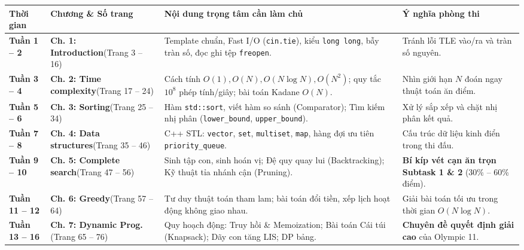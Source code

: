 \documentclass[11pt,a4paper]{article}
\begin{document}
\vspace{-0.2cm}
\begin{center}
\footnotesize
\begin{tabular}{@{}p{1.8cm}p{3.2cm}p{7.8cm}p{3.8cm}@{}}
\toprule
\textbf{Thời gian} & \textbf{Chương \& Số trang} & \textbf{Nội dung trọng tâm cần làm chủ} & \textbf{Ý nghĩa phòng thi} \\ \midrule
\textbf{Tuần 1 -- 2} & \textbf{Ch. 1: Introduction}\newline (Trang 3 -- 16) & Template chuẩn, Fast I/O (\texttt{cin.tie}), kiểu \texttt{long long}, bẫy tràn số, đọc ghi tệp \texttt{freopen}. & Tránh lỗi TLE vào/ra và tràn số nguyên. \\
\addlinespace[2pt]
\textbf{Tuần 3 -- 4} & \textbf{Ch. 2: Time complexity}\newline (Trang 17 -- 24) & Cách tính $O(1), O(N), O(N \log N), O(N^2)$; quy tắc $10^8$ phép tính/giây; bài toán Kadane $O(N)$. & Nhìn giới hạn $N$ đoán ngay thuật toán ăn điểm. \\
\addlinespace[2pt]
\textbf{Tuần 5 -- 6} & \textbf{Ch. 3: Sorting}\newline (Trang 25 -- 34) & Hàm \texttt{std::sort}, viết hàm so sánh (Comparator); Tìm kiếm nhị phân (\texttt{lower\_bound}, \texttt{upper\_bound}). & Xử lý sắp xếp và chặt nhị phân kết quả. \\
\addlinespace[2pt]
\textbf{Tuần 7 -- 8} & \textbf{Ch. 4: Data structures}\newline (Trang 35 -- 46) & C++ STL: \texttt{vector}, \texttt{set}, \texttt{multiset}, \texttt{map}, hàng đợi ưu tiên \texttt{priority\_queue}. & Cấu trúc dữ liệu kinh điển trong thi đấu. \\
\addlinespace[2pt]
\textbf{Tuần 9 -- 10} & \textbf{Ch. 5: Complete search}\newline (Trang 47 -- 56) & Sinh tập con, sinh hoán vị; Đệ quy quay lui (Backtracking); Kỹ thuật tỉa nhánh cận (Pruning). & \textbf{Bí kíp vét cạn ăn trọn Subtask 1 \& 2} (30\% -- 60\% điểm). \\
\addlinespace[2pt]
\textbf{Tuần 11 -- 12} & \textbf{Ch. 6: Greedy}\newline (Trang 57 -- 64) & Tư duy thuật toán tham lam; bài toán đổi tiền, xếp lịch hoạt động không giao nhau. & Giải bài toán tối ưu trong thời gian $O(N \log N)$. \\
\addlinespace[2pt]
\textbf{Tuần 13 -- 16} & \textbf{Ch. 7: Dynamic Prog.}\newline (Trang 65 -- 76) & Quy hoạch động: Truy hồi \& Memoization; Bài toán Cái túi (Knapsack); Dãy con tăng LIS; DP bảng. & \textbf{Chuyên đề quyết định giải cao} của Olympic 11. \\

\end{tabular}
\end{center}
\end{document}
